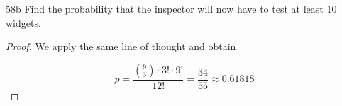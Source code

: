 \begin{exercise}{58b}
    Find the probability that the inspector will now have to test at least 10 widgets.
\end{exercise}

\begin{proof}
    We apply the same line of thought and obtain

    $$p = \frac{ {9 \choose 3} \cdot 3! \cdot 9!}{12!} = \frac{34}{55} \approx 0.61818$$

\end{proof}

\newpage


